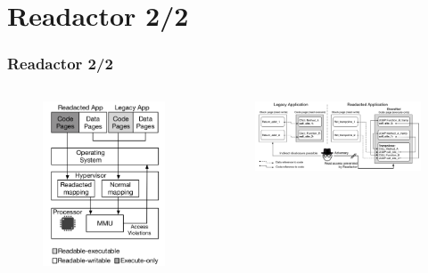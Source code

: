 \documentclass[aspectratio=169]{beamer}
\begin{document}
\section{Readactor 2/2}
\begin{frame}
\frametitle{Readactor 2/2}
\begin{columns}[c]
\begin{figure}
\includegraphics[width=1.0\linewidth]{figures/readactor-ept.pdf}
\end{figure} \pause
{}
\begin{figure}
\includegraphics[width=1.0\linewidth]{figures/readactor-return.pdf}
\end{figure}
\end{columns}
\end{frame}
\end{document}
